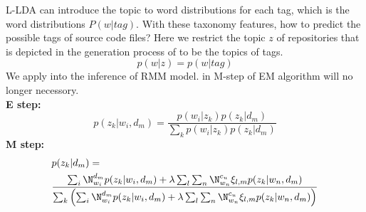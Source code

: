 L-LDA can introduce the topic to word distributions for each tag, which is the
word distributions $P(w|tag)$. With these taxonomy features, how to predict
the possible tags of source code files? Here we restrict the topic $z$ of repositories
that is depicted in the generation process of  to be the
topics of tags.
\[
\label{ztag}
p(w|z)=p(w|tag)\]
We apply  into the inference of RMM model.  in M-step
of EM algorithm will no longer necessory.\\
{\bf E step:}
\[p(z_k|w_i,d_m) = \frac { p(w_i|z_k)p(z_k|d_m) }{ \sum _{k}{p(w_i|z_k)p(z_k|d_m)} }\]
{\bf M step:}
\begin{align}
\label{equ:mstep2}
\begin{split}
&p(z_k|d_m) = \\
&\frac{\sum _{i}{\N_{w_i}^{d_m}p(z_k|w_i,d_m)+\lambda \sum _{l} \sum _{n}{\N_{w_n}^{c_u}\xi  _{l,m}p(z_k|w_n,d_m)}}}{\sum _{k}\left(\sum _{i}{\N_{w_i}^{d_m}p(z_k|w_i,d_m)+\lambda \sum _{l} \sum _{n}{\N_{w_n}^{c_u}\xi  _{l,m}p(z_k|w_n,d_m)}}\right)}\\
\end{split}
\end{align}




